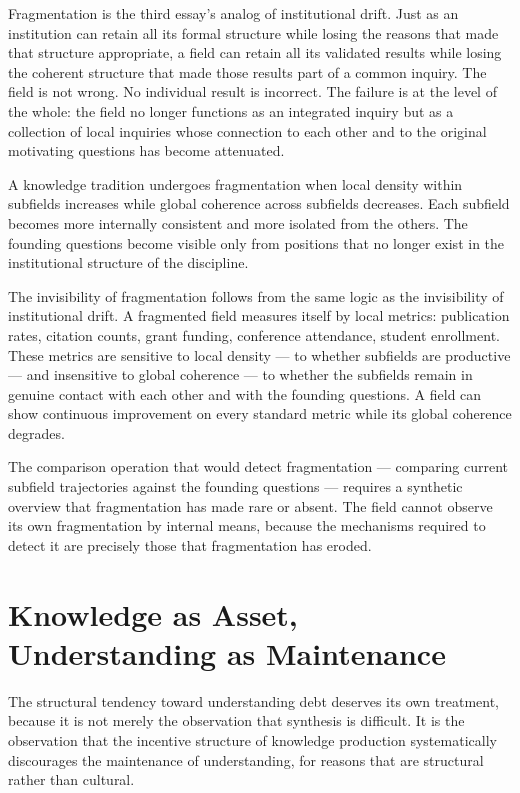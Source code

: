 Fragmentation is the third essay's analog of institutional drift. Just as an
institution can retain all its formal structure while losing the reasons that
made that structure appropriate, a field can retain all its validated results
while losing the coherent structure that made those results part of a common
inquiry. The field is not wrong. No individual result is incorrect. The failure
is at the level of the whole: the field no longer functions as an integrated
inquiry but as a collection of local inquiries whose connection to each other
and to the original motivating questions has become attenuated.

\begin{observation}
A knowledge tradition undergoes fragmentation when local density within
subfields increases while global coherence across subfields decreases. Each
subfield becomes more internally consistent and more isolated from the others.
The founding questions become visible only from positions that no longer exist
in the institutional structure of the discipline.
\end{observation}

The invisibility of fragmentation follows from the same logic as the invisibility
of institutional drift. A fragmented field measures itself by local metrics:
publication rates, citation counts, grant funding, conference attendance,
student enrollment. These metrics are sensitive to local density --- to
whether subfields are productive --- and insensitive to global coherence ---
to whether the subfields remain in genuine contact with each other and with
the founding questions. A field can show continuous improvement on every
standard metric while its global coherence degrades.

The comparison operation that would detect fragmentation --- comparing current
subfield trajectories against the founding questions --- requires a synthetic
overview that fragmentation has made rare or absent. The field cannot observe
its own fragmentation by internal means, because the mechanisms required to
detect it are precisely those that fragmentation has eroded.

\section{Knowledge as Asset, Understanding as Maintenance}

The structural tendency toward understanding debt deserves its own treatment,
because it is not merely the observation that synthesis is difficult. It is
the observation that the incentive structure of knowledge production systematically
discourages the maintenance of understanding, for reasons that are structural
rather than cultural.

